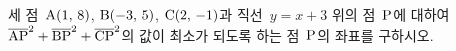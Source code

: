 세 점~$\mathrm{A}(1,\,8)$, $\mathrm{B}(-3,\,5)$, $\mathrm{C}(2,\,-1)$과 직선~$y=x+3$ 위의 점~$\mathrm{P}$에 대하여 $\overline{\mathrm{AP}}^2+\overline{\mathrm{BP}}^2+\overline{\mathrm{CP}}^2$의 값이 최소가 되도록 하는 점~$\mathrm{P}$의 좌표를 구하시오.
